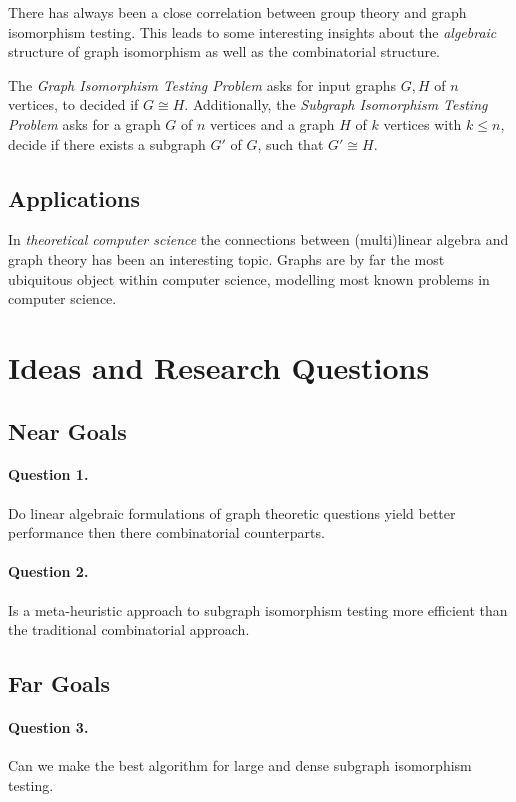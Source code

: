 \message{ !name(subgraph_iso_note.tex)}\documentclass[12pt]{article}
\begin{document}
There has always been a close correlation between group theory and graph isomorphism testing. This leads to some interesting insights about the \textit{algebraic} structure of graph isomorphism as well as the combinatorial structure.

The \textit{Graph Isomorphism Testing Problem} asks for input graphs $G,H$ of $n$ vertices, to decided if $G\cong H$. Additionally, the \textit{Subgraph Isomorphism Testing Problem} asks for a graph $G$ of $n$ vertices and a graph $H$ of $k$ vertices with $k \leq n$, decide if there exists a subgraph $G'$ of $G$, such that $G'\cong H$.

\subsection{Applications}

In \textit{theoretical computer science} the connections between (multi)linear algebra and graph theory has been an interesting topic. Graphs are by far the most ubiquitous object within computer science, modelling most known problems in computer science.

\section{Ideas and Research Questions}

\subsection{Near Goals}

\paragraph{Question 1.} Do linear algebraic formulations of graph theoretic questions yield better performance then there combinatorial counterparts.

\paragraph{Question 2.} Is a meta-heuristic approach to subgraph isomorphism testing more efficient than the traditional combinatorial approach.

\subsection{Far Goals}

\paragraph{Question 3.} Can we make the best algorithm for large and dense subgraph isomorphism testing.
\end{document}
